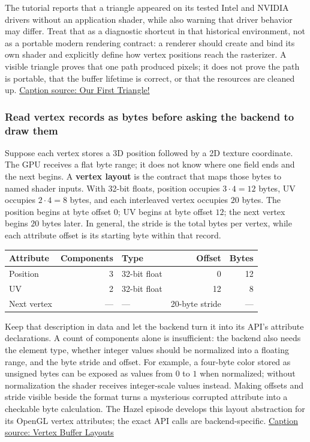 The tutorial reports that a triangle appeared on its tested Intel and NVIDIA drivers without an application shader, while also warning that driver behavior may differ. Treat that as a diagnostic shortcut in that historical environment, not as a portable modern rendering contract: a renderer should create and bind its own shader and explicitly define how vertex positions reach the rasterizer. A visible triangle proves that one path produced pixels; it does not prove the path is portable, that the buffer lifetime is correct, or that the resources are cleaned up. \href{https://www.youtube.com/watch?v=bwFYXo0VgCc}{Caption source: Our First Triangle!}

\subsubsection{Read vertex records as bytes before asking the backend to draw them}\label{read-vertex-records-as-bytes-before-asking-the-backend-to-draw-them}

Suppose each vertex stores a 3D position followed by a 2D texture coordinate. The GPU receives a flat byte range; it does not know where one field ends and the next begins. A \textbf{vertex layout} is the contract that maps those bytes to named shader inputs. With 32-bit floats, position occupies \(3\cdot4=12\) bytes, UV occupies \(2\cdot4=8\) bytes, and each interleaved vertex occupies \(20\) bytes. The position begins at byte offset \(0\); UV begins at byte offset \(12\); the next vertex begins \(20\) bytes later. In general, the stride is the total bytes per vertex, while each attribute offset is its starting byte within that record.

{\def\LTcaptype{none} %
\begin{longtable}[]{@{}lrlrr@{}}
\toprule\noalign{}
Attribute & Components & Type & Offset & Bytes \\
\midrule\noalign{}
\endhead
\bottomrule\noalign{}
\endlastfoot
Position & 3 & 32-bit float & 0 & 12 \\
UV & 2 & 32-bit float & 12 & 8 \\
Next vertex & --- & --- & 20-byte stride & --- \\
\end{longtable}
}

Keep that description in data and let the backend turn it into its API's attribute declarations. A count of components alone is insufficient: the backend also needs the element type, whether integer values should be normalized into a floating range, and the byte stride and offset. For example, a four-byte color stored as unsigned bytes can be exposed as values from \(0\) to \(1\) when normalized; without normalization the shader receives integer-scale values instead. Making offsets and stride visible beside the format turns a mysterious corrupted attribute into a checkable byte calculation. The Hazel episode develops this layout abstraction for its OpenGL vertex attributes; the exact API calls are backend-specific. \href{https://www.youtube.com/watch?v=jIJFM_pi6gQ}{Caption source: Vertex Buffer Layouts}


